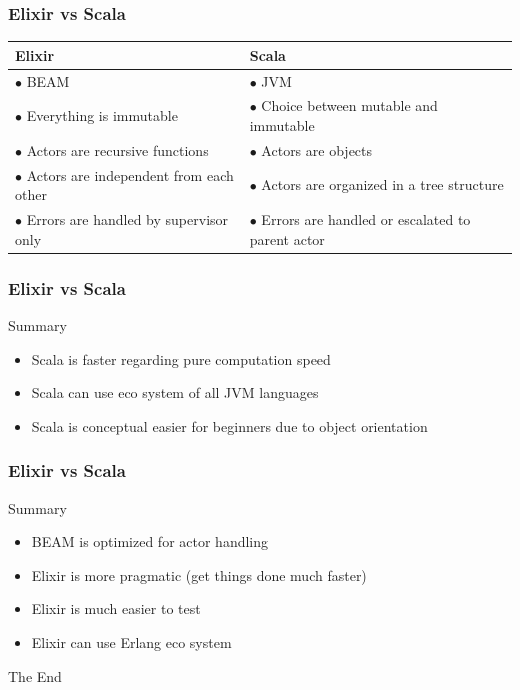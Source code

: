 \documentclass{beamer}
\begin{document}
\begin{frame}
\frametitle{Elixir vs Scala}
\begin{table}
\begin{tabular}{p{5cm} p{5cm}}
\toprule
\textbf{Elixir} & \textbf{Scala}\\
\midrule
$\bullet$ BEAM & $\bullet$ JVM \\
$\bullet$ Everything is immutable & $\bullet$ Choice between mutable and immutable\\
$\bullet$ Actors are recursive functions & $\bullet$ Actors are objects\\
$\bullet$ Actors are independent from each other & $\bullet$ Actors are organized in a tree structure \\
$\bullet$ Errors are handled by supervisor only & $\bullet$ Errors are handled or escalated to parent actor\\\bottomrule
\end{tabular}
\end{table}
\end{frame}



\begin{frame}
\frametitle{Elixir vs Scala}
\Huge{Summary}
\Large
\begin{itemize}
\item Scala is faster regarding pure computation speed
\item Scala can use eco system of all JVM languages
\item Scala is conceptual easier for beginners due to object orientation
\end{itemize}
\end{frame}


\begin{frame}
\frametitle{Elixir vs Scala}
\Huge{Summary}
\Large
\begin{itemize}
\item BEAM is optimized for actor handling
\item Elixir is more pragmatic (get things done much faster)
\item Elixir is much easier to test
\item Elixir can use Erlang eco system
\end{itemize}
\end{frame}



\begin{frame}
\Huge{\centerline{The End}}
\end{frame}

\end{document}
